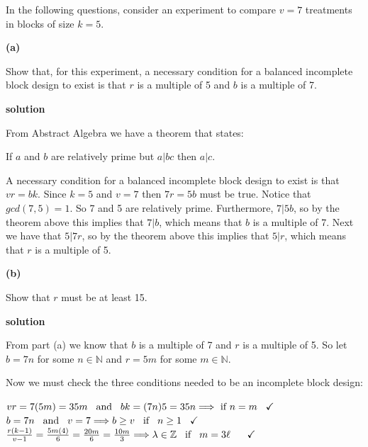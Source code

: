 \documentclass[12pt,]{article}
\begin{document}
In the following questions, consider an experiment to compare \(v = 7\)
treatments in blocks of size \(k = 5\).

\textbf{(a)}

Show that, for this experiment, a necessary condition for a balanced
incomplete block design to exist is that \(r\) is a multiple of 5 and
\(b\) is a multiple of 7.

\textbf{solution}

From Abstract Algebra we have a theorem that states:

If \(a\) and \(b\) are relatively prime but \(a| bc\) then \(a|c\).

A necessary condition for a balanced incomplete block design to exist is
that \(vr = bk\). Since \(k = 5\) and \(v= 7\) then \(7r= 5b\) must be
true. Notice that \(gcd(7,5)=1\). So 7 and 5 are relatively prime.
Furthermore, \(7|5b\), so by the theorem above this implies that
\(7|b\), which means that \(b\) is a multiple of 7. Next we have that
\(5|7r\), so by the theorem above this implies that \(5|r\), which means
that \(r\) is a multiple of 5.

\textbf{(b)}

Show that \(r\) must be at least 15.

\textbf{solution}

From part (a) we know that \(b\) is a multiple of 7 and \(r\) is a
multiple of 5. So let \(b= 7n\) for some \(n \in \mathbb{N}\) and
\(r= 5m\) for some \(m \in \mathbb{N}\).

Now we must check the three conditions needed to be an incomplete block
design:

\begin{center}
$vr = 7(5m) = 35m  \hspace{.3cm} \text{and} \hspace{.3cm} bk = (7n)5 = 35n \Longrightarrow \text{ if } n=m \hspace{.3cm}  \checkmark$\\
$b= 7n \hspace{.3cm} \text{and} \hspace{.3cm}  v=7 \Longrightarrow b \geq v \hspace{.3cm} \text{if} \hspace{.3cm} n \geq 1 \hspace{.3cm}  \checkmark$\\
$\frac{r(k-1)}{v-1} = \frac{5m(4)}{6} = \frac{20m}{6} = \frac{10m}{3}  
 \Longrightarrow  \lambda  \in \mathbb{Z} \hspace{.3cm} \text{if} \hspace{.3cm} m = 3\ell  \hspace{.3cm} \hspace{.3cm}  \checkmark$
\end{center}
\end{document}
